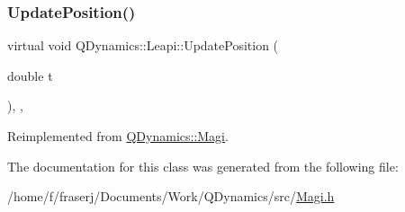 \subsubsection{\texorpdfstring{Update\+Position()}{UpdatePosition()}}
{\footnotesize\ttfamily virtual void Q\+Dynamics\+::\+Leapi\+::\+Update\+Position (\begin{DoxyParamCaption}\item[{double}]{t }\end{DoxyParamCaption})\hspace{0.3cm}{\ttfamily [inline]}, {\ttfamily [private]}, {\ttfamily [virtual]}}



Reimplemented from \hyperlink{classQDynamics_1_1Magi_a500467f899244edfae15f34c84c7684c}{Q\+Dynamics\+::\+Magi}.



The documentation for this class was generated from the following file\+:\begin{DoxyCompactItemize}
\item 
/home/f/fraserj/\+Documents/\+Work/\+Q\+Dynamics/src/\hyperlink{Magi_8h}{Magi.\+h}\end{DoxyCompactItemize}
